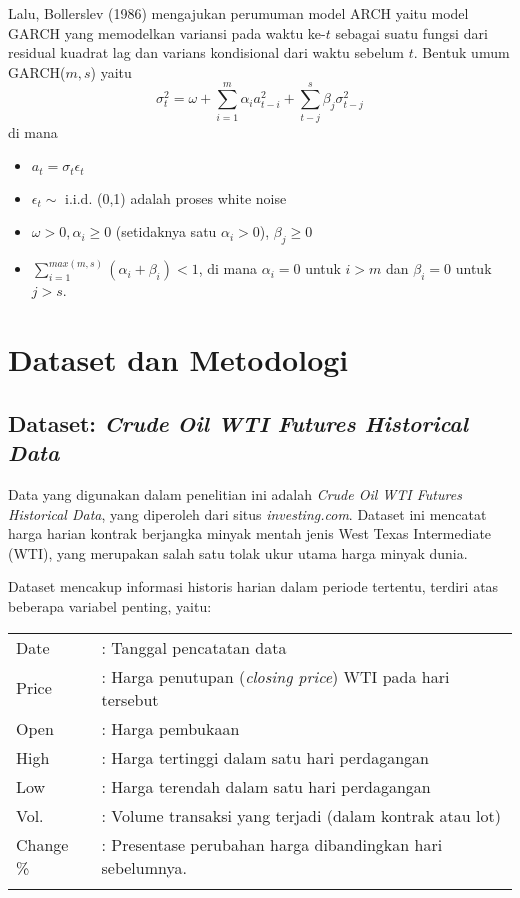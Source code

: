 \documentclass[a4paper,12pt]{article}
\begin{document}
Lalu, Bollerslev (1986) mengajukan perumuman model ARCH yaitu model GARCH yang memodelkan variansi pada waktu ke-$t$ sebagai suatu fungsi dari residual kuadrat lag dan varians kondisional dari waktu sebelum $t$. Bentuk umum GARCH($m, s$) yaitu
\begin{equation}
    \label{eq:garch}
    \sigma^2_t = \omega + \sum^m_{i=1} \alpha_ia^2_{t-i} + \sum^s_{t-j}\beta_j\sigma^2_{t-j}
\end{equation} di mana \begin{itemize}
    \item $a_t = \sigma_t\epsilon_t$
    \item $\epsilon_t \sim$ i.i.d. (0,1) adalah proses white noise
    \item $\omega>0, \alpha_i\geq 0$ (setidaknya satu $\alpha_i >0$), $\beta_j \geq 0$
    \item $\sum ^{max(m, s)}_{i=1}(\alpha_i + \beta_i )<1$, di mana $\alpha_i = 0$ untuk $i>m$ dan $\beta_i = 0$ untuk $j>s$.
\end{itemize}


\section{Dataset dan Metodologi}

\subsection{Dataset: \textit{Crude Oil WTI Futures Historical Data}}
Data yang digunakan dalam penelitian ini adalah \textit{Crude Oil WTI Futures Historical Data}, yang diperoleh dari situs \textit{investing.com}. Dataset ini mencatat harga harian kontrak berjangka minyak mentah jenis West Texas Intermediate (WTI), yang merupakan salah satu tolak ukur utama harga minyak dunia.

Dataset mencakup informasi historis harian dalam periode tertentu, terdiri atas beberapa variabel penting, yaitu:

\begin{tabular}{l l}
    \centering
    Date & : Tanggal pencatatan data \\
    Price & : Harga penutupan (\textit{closing price}) WTI pada hari tersebut \\
    Open & : Harga pembukaan\\
    High & : Harga tertinggi dalam satu hari perdagangan \\
    Low & : Harga terendah dalam satu hari perdagangan \\
    Vol. & : Volume transaksi yang terjadi (dalam kontrak atau lot)\\
    Change \% & : Presentase perubahan harga dibandingkan hari sebelumnya.\\
    &
\end{tabular}
\end{document}
